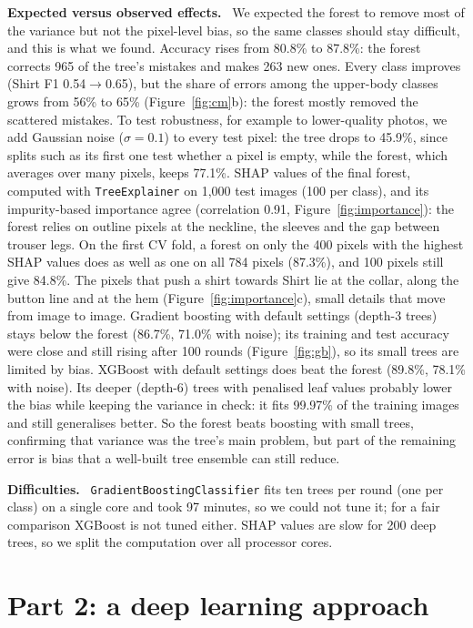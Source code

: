 \documentclass[11pt,a4paper]{article}
\newcommand{\pkg}[1]{\texttt{#1}}
\newcommand{\para}[1]{\textbf{#1}\ }
\begin{document}
\para{Expected versus observed effects.} We expected the forest to remove most of the variance but not the pixel-level bias, so the same classes should stay difficult, and this is what we found. Accuracy rises from 80.8\% to 87.8\%: the forest corrects 965 of the tree's mistakes and makes 263 new ones. Every class improves (Shirt F1 0.54$\to$0.65), but the share of errors among the upper-body classes grows from 56\% to 65\% (Figure~\ref{fig:cm}b): the forest mostly removed the scattered mistakes. To test robustness, for example to lower-quality photos, we add Gaussian noise ($\sigma=0.1$) to every test pixel: the tree drops to 45.9\%, since splits such as its first one test whether a pixel is empty, while the forest, which averages over many pixels, keeps 77.1\%. SHAP values of the final forest, computed with \pkg{TreeExplainer} on 1{,}000 test images (100 per class), and its impurity-based importance agree (correlation 0.91, Figure~\ref{fig:importance}): the forest relies on outline pixels at the neckline, the sleeves and the gap between trouser legs. On the first CV fold, a forest on only the 400 pixels with the highest SHAP values does as well as one on all 784 pixels (87.3\%), and 100 pixels still give 84.8\%. The pixels that push a shirt towards Shirt lie at the collar, along the button line and at the hem (Figure~\ref{fig:importance}c), small details that move from image to image. Gradient boosting with default settings (depth-3 trees) stays below the forest (86.7\%, 71.0\% with noise); its training and test accuracy were close and still rising after 100 rounds (Figure~\ref{fig:gb}), so its small trees are limited by bias. XGBoost \citep{xgboost} with default settings does beat the forest (89.8\%, 78.1\% with noise). Its deeper (depth-6) trees with penalised leaf values probably lower the bias while keeping the variance in check: it fits 99.97\% of the training images and still generalises better. So the forest beats boosting with small trees, confirming that variance was the tree's main problem, but part of the remaining error is bias that a well-built tree ensemble can still reduce.

\para{Difficulties.} \pkg{GradientBoostingClassifier} fits ten trees per round (one per class) on a single core and took 97 minutes, so we could not tune it; for a fair comparison XGBoost is not tuned either. SHAP values are slow for 200 deep trees, so we split the computation over all processor cores.

\section{Part 2: a deep learning approach}
\end{document}
